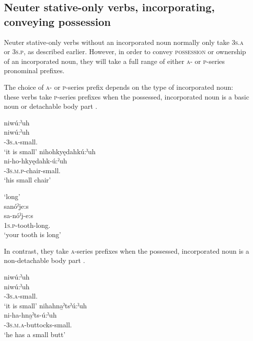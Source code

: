 \subsection{Neuter stative-only verbs, incorporating, conveying possession} \label{Neuter stative-only verbs, incorporating, conveying possession}
Neuter stative-only verbs without an incorporated noun normally only take \linebreak {} \textsc{3s.a} or  \textsc{3s.p}, as described earlier. However, in order to convey \textsc{possession} or ownership  of an incorporated noun, they will take a full range of either \textsc{a}- or \textsc{p}-series pronominal prefixes. 


The choice of \textsc{a}- or \textsc{p}-series prefix depends on the type of incorporated noun: these verbs take \textsc{p}-series prefixes when the possessed, incorporated noun is a basic noun or detachable body part .
 
\ea\label{ex:adjvbppchoicex12} 
\ea niwú:ˀuh\\
\gll  niwú:ˀuh\\
{\partitive}-\textsc{3s.a}-small.{\stative}\\
\glt ‘it is small’
\ex nihohkyędahkú:ˀuh\\
\gll ni-ho-hkyędahk-ú:ˀuh\\
 {\partitive}-\textsc{3s.m.p}-chair-small.{\stative}\\
\glt `his small chair'
\z
\z

\newpage
\ea\label{ex:adjvbppchoicex120}  ‘long’\\
sanóˀje:s\\
\gll sa-nóˀj-e:s\\
 \textsc{1s.p}-tooth-long.{\stative}\\
\glt `your tooth is long'
\z


In contrast, they take \textsc{a}-series prefixes when the possessed, incorporated noun is a non-detachable body part .  

\ea\label{ex:adjvbppchoicex11} 
\ea niwú:ˀuh\\
\gll niwú:ˀuh\\
{\partitive}-\textsc{3s.a}-small.{\stative}\\
\glt ‘it is small’ 
\ex nihahna̱ˀtsˀú:ˀuh\\
\gll ni-ha-hna̱ˀts-ú:ˀuh\\
 {\partitive}-\textsc{3s.m.a}-buttocks-small.{\stative}\\
\glt `he has a small butt'
\z
\z

